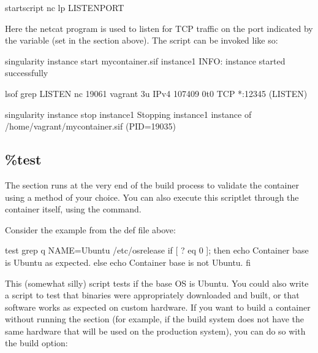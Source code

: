 \documentclass[letterpaper,10pt,english]{sphinxmanual}
\begin{document}
%
\begin{sphinxVerbatim}[commandchars=\\\{\}]
\PYGZpc{}startscript
    nc \PYGZhy{}lp \PYGZdl{}LISTEN\PYGZus{}PORT
\end{sphinxVerbatim}

Here the netcat program is used to listen for TCP traffic on the port indicated
by the  variable (set in the  section above).
The script can be invoked like so:

%
\begin{sphinxVerbatim}[commandchars=\\\{\}]
\PYGZdl{} singularity instance start my\PYGZus{}container.sif instance1
INFO:    instance started successfully

\PYGZdl{} lsof \textbar{} grep LISTEN
nc        19061               vagrant    3u     IPv4             107409      0t0        TCP *:12345 (LISTEN)

\PYGZdl{} singularity instance stop instance1
Stopping instance1 instance of /home/vagrant/my\PYGZus{}container.sif (PID=19035)
\end{sphinxVerbatim}


\subsection{\%test}
\label{\detokenize{definition_files:test}}
The  section runs at the very end of the build process to validate the
container using a method of your choice. You can also execute this scriptlet
through the container itself, using the  command.

Consider the example from the def file above:

%
\begin{sphinxVerbatim}[commandchars=\\\{\}]
\PYGZpc{}test
    grep \PYGZhy{}q NAME=\PYGZbs{}\PYGZdq{}Ubuntu\PYGZbs{}\PYGZdq{} /etc/os\PYGZhy{}release
    if [ \PYGZdl{}? \PYGZhy{}eq 0 ]; then
        echo \PYGZdq{}Container base is Ubuntu as expected.\PYGZdq{}
    else
        echo \PYGZdq{}Container base is not Ubuntu.\PYGZdq{}
    fi
\end{sphinxVerbatim}

This (somewhat silly) script tests if the base OS is Ubuntu. You could also
write a script to test that binaries were appropriately downloaded and built, or
that software works as expected on custom hardware. If you want to build a
container without running the  section (for example, if the build
system does not have the same hardware that will be used on the production
system), you can do so with the  build option:
\end{document}
